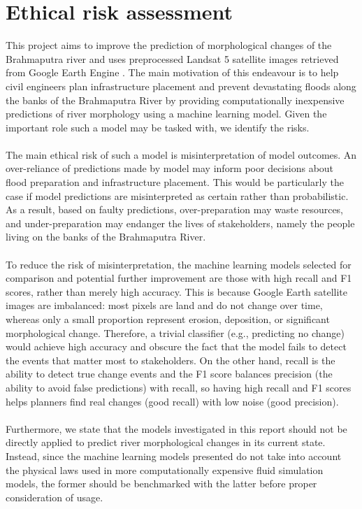 \documentclass[10pt,oneside,a4paper,english]{article}
\begin{document}
\section{Ethical risk assessment}
This project aims to improve the prediction of morphological changes of the Brahmaputra river and uses preprocessed Landsat 5 satellite images retrieved from Google Earth Engine \cite{magherini2024jamunet}. The main motivation of this endeavour is to help civil engineers plan infrastructure placement and prevent devastating floods along the banks of the Brahmaputra River by providing computationally inexpensive predictions of river morphology using a machine learning model. Given the important role such a model may be tasked with, we identify the risks. \\
\\
The main ethical risk of such a model is misinterpretation of model outcomes. An over-reliance of predictions made by model may inform poor decisions about flood preparation and infrastructure placement. This would be particularly the case if model predictions are misinterpreted as certain rather than probabilistic. As a result, based on faulty predictions, over-preparation may waste resources, and under-preparation may endanger the lives of stakeholders, namely the people living on the banks of the Brahmaputra River. \\
\\
To reduce the risk of misinterpretation, the machine learning models selected for comparison and potential further improvement are those with high recall and F1 scores, rather than merely high accuracy. This is because Google Earth satellite images are imbalanced: most pixels are land and do not change over time, whereas only a small proportion represent erosion, deposition, or significant morphological change. Therefore, a trivial classifier (e.g., predicting no change) would achieve high accuracy and obscure the fact that the model fails to detect the events that matter most to stakeholders. On the other hand, recall is the ability to detect true change events and the F1 score balances precision (the ability to avoid false predictions) with recall, so having high recall and F1 scores helps planners find real changes (good recall) with low noise (good precision). \\
\\
Furthermore, we state that the models investigated in this report should not be directly applied to predict river morphological changes in its current state. Instead, since the machine learning models presented do not take into account the physical laws used in more computationally expensive fluid simulation models, the former should be benchmarked with the latter before proper consideration of usage.
\end{document}
